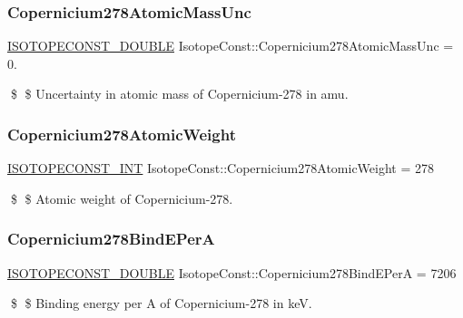 \subsubsection{\texorpdfstring{Copernicium278\+Atomic\+Mass\+Unc}{Copernicium278AtomicMassUnc}}
{\footnotesize\ttfamily \mbox{\hyperlink{group___isotope_const-_macros_ga8f45a7272ce02c0b4c65c44636ed719a}{I\+S\+O\+T\+O\+P\+E\+C\+O\+N\+S\+T\+\_\+\+D\+O\+U\+B\+LE}} Isotope\+Const\+::\+Copernicium278\+Atomic\+Mass\+Unc = 0.}

\$ \$ Uncertainty in atomic mass of Copernicium-\/278 in amu. \mbox{\label{group___isotope_const-_copernicium-_cn278_gaea1798e1f7219ac55835a3724ae53bea}} 
\subsubsection{\texorpdfstring{Copernicium278\+Atomic\+Weight}{Copernicium278AtomicWeight}}
{\footnotesize\ttfamily \mbox{\hyperlink{group___isotope_const-_macros_ga5f18360b3e99483a35c32d789e62621c}{I\+S\+O\+T\+O\+P\+E\+C\+O\+N\+S\+T\+\_\+\+I\+NT}} Isotope\+Const\+::\+Copernicium278\+Atomic\+Weight = 278}

\$ \$ Atomic weight of Copernicium-\/278. \mbox{\label{group___isotope_const-_copernicium-_cn278_gaf5e566af1f5e47cee0f9eeb4873a613d}} 
\subsubsection{\texorpdfstring{Copernicium278\+Bind\+E\+PerA}{Copernicium278BindEPerA}}
{\footnotesize\ttfamily \mbox{\hyperlink{group___isotope_const-_macros_ga8f45a7272ce02c0b4c65c44636ed719a}{I\+S\+O\+T\+O\+P\+E\+C\+O\+N\+S\+T\+\_\+\+D\+O\+U\+B\+LE}} Isotope\+Const\+::\+Copernicium278\+Bind\+E\+PerA = 7206}

\$ \$ Binding energy per A of Copernicium-\/278 in keV. \mbox{\label{group___isotope_const-_copernicium-_cn278_ga5a913debf6758a073d37a71a7ae9c5e5}} 

